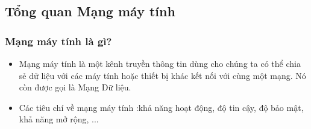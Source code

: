 \documentclass[13pt]{article}
\begin{document}
\subsection{Tổng quan Mạng máy tính}
\subsubsection{Mạng máy tính là gì?}
\begin{itemize}
    \item Mạng máy tính là một kênh truyền thông tin dùng cho chúng ta có thể chia sẻ dữ liệu với các máy tính hoặc thiết bị khác kết nối với cùng một mạng. Nó còn được gọi là Mạng Dữ liệu.
    \item Các tiêu chí về mạng máy tính :khả năng hoạt động, độ tin cậy, độ bảo mật, khả năng mở rộng, ...
\end{itemize}
\end{document}
